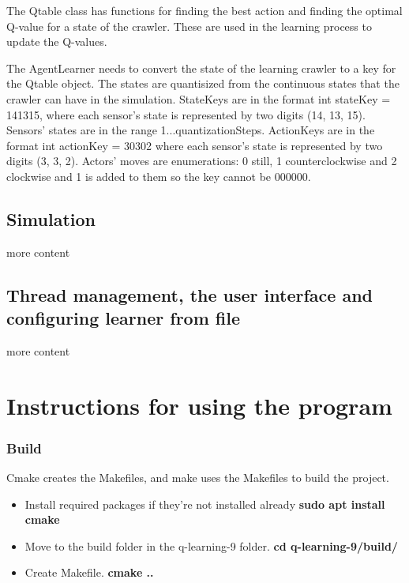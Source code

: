 \documentclass{article}
\begin{document}
The Qtable class has functions for finding the best action and finding
the optimal Q-value for a state of the crawler. These are used in the
learning process to update the Q-values.

The AgentLearner needs to convert the state of the learning crawler to a key
for the Qtable object. The states are quantisized from the continuous states
that the crawler can have in the simulation. StateKeys are in the format
int stateKey = 141315, where each sensor's
state is represented by two digits (14, 13, 15). Sensors' states are
in the range 1...quantizationSteps. ActionKeys are in the format
int actionKey = 30302 where each sensor's
state is represented by two digits (3, 3, 2). Actors' moves are
enumerations: 0 still, 1 counterclockwise and 2 clockwise and 1 is
added to them so the key cannot be 000000.

\subsection{Simulation}

more content

\subsection{Thread management,
the user interface and configuring learner from file}

more content


\section{Instructions for using the program}

\subsubsection{Build}

Cmake creates the Makefiles, and make uses the Makefiles to build the project.

\begin{itemize}
  \item Install required packages if they're not installed already
  \textbf{sudo apt install cmake}

  \item Move to the build folder in the q-learning-9 folder.
  \textbf{cd q-learning-9/build/}

  \item Create Makefile.
  \textbf{cmake ..}
\end{itemize}
\end{document}
